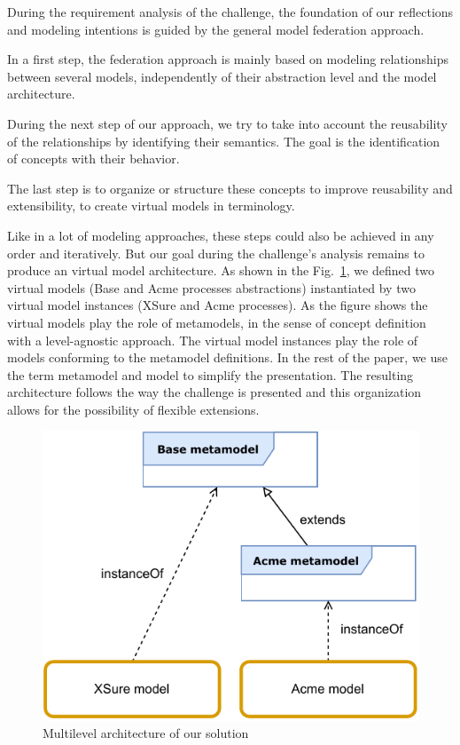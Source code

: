 
During the requirement analysis of the challenge, the foundation of our reflections and modeling intentions is guided by the general model federation approach.

In a first step, the federation approach is mainly based on modeling relationships between several models, independently of their abstraction level and the model architecture.

During the next step of our approach, we try to take into account the reusability of the relationships by identifying their semantics. The goal is the identification of concepts with their behavior.

The last step is to organize or structure these concepts to improve reusability and extensibility, to create virtual models in \FML terminology.

Like in a lot of modeling approaches, these  steps could also be achieved in any order and iteratively. But our goal during the challenge's analysis remains to produce an \FML virtual model architecture.
As shown in the Fig.~\ref{fig:MultilevelArchitecture}, we defined two virtual models (Base and Acme processes abstractions) instantiated by two virtual model instances (XSure and Acme processes). As the figure shows the virtual models play the role of metamodels, in the sense of concept definition with a level-agnostic approach. The virtual model instances play the role of models conforming to the metamodel definitions. In the rest of the paper, we use the term metamodel and model to simplify the presentation.
The resulting architecture follows the way the challenge is presented and this
organization allows for the possibility of flexible extensions.


\begin{figure}[t]
    \centering
    \includegraphics[width=0.9 \columnwidth]{Figures/MultilevelArchitecture-1.5.pdf}
    \caption{Multilevel architecture of our solution}
    \label{fig:MultilevelArchitecture}
\end{figure}

